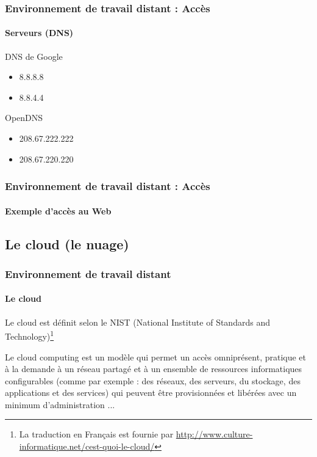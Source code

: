 \documentclass[xcolor=table]{beamer}
\begin{document}
\begin{frame}
\frametitle{Environnement de travail distant : Accès}
\framesubtitle{Serveurs (DNS)}

\begin{minipage}{0.65\textwidth}
\end{minipage}
%
\begin{minipage}{0.30\textwidth}
	DNS de Google
	\begin{itemize}
		\item 8.8.8.8
		\item 8.8.4.4
	\end{itemize}

	OpenDNS
	\begin{itemize}
		\item 208.67.222.222
		\item 208.67.220.220
	\end{itemize}

\end{minipage}

\end{frame}

\begin{frame}
\frametitle{Environnement de travail distant : Accès}
\framesubtitle{Exemple d'accès au Web}


\end{frame}


%
%
%
%


\subsection{Le cloud (le nuage)}

\begin{frame}
\frametitle{Environnement de travail distant}
\framesubtitle{Le cloud}

Le cloud est définit selon le NIST (National Institute of Standards and Technology)\footnote{La traduction en Français est fournie par \url{http://www.culture-informatique.net/cest-quoi-le-cloud/}}
\begin{definition}
	Le cloud computing est un modèle qui permet un accès omniprésent, pratique et à la demande à un réseau partagé et à un ensemble de ressources informatiques configurables (comme par exemple : des réseaux, des serveurs, du stockage, des applications et des services) qui peuvent être provisionnées et libérées avec un minimum d’administration ...
\end{definition}

\end{frame}
\end{document}
